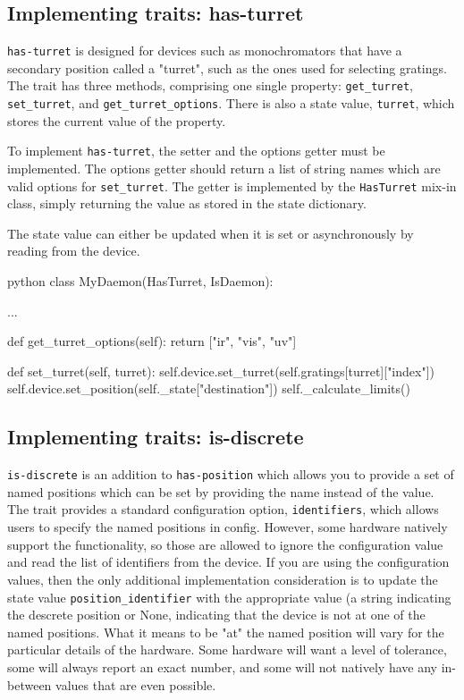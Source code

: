 \subsection{Implementing traits: has-turret}

\texttt{has-turret} is designed for devices such as monochromators that have a secondary position called a "turret", such as the ones used for selecting gratings.
The trait has three methods, comprising one single \yaq{} property: \texttt{get\_turret}, \texttt{set\_turret}, and \texttt{get\_turret\_options}.
There is also a state value, \texttt{turret}, which stores the current value of the property.

To implement \texttt{has-turret}, the setter and the options getter must be implemented.
The options getter should return a list of string names which are valid options for \texttt{set\_turret}.
The getter is implemented by the \texttt{HasTurret} mix-in class, simply returning the value as stored in the state dictionary.

The state value can either be updated when it is set or asynchronously by reading from the device.

\begin{codefragment}{python}
class MyDaemon(HasTurret, IsDaemon):

    ...

    def get_turret_options(self):
        return ["ir", "vis", "uv"]

    def set_turret(self, turret):
        self.device.set_turret(self.gratings[turret]["index"])
        self.device.set_position(self._state["destination"])
        self._calculate_limits()
\end{codefragment}

\subsection{Implementing traits: is-discrete}

\texttt{is-discrete} is an addition to \texttt{has-position} which allows you to provide a set of named positions which can be set by providing the name instead of the value.
The trait provides a standard configuration option, \texttt{identifiers}, which allows users to specify the named positions in config.
However, some hardware natively support the functionality, so those are allowed to ignore the configuration value and read the list of identifiers from the device.
If you are using the configuration values, then the only additional implementation consideration is to update the state value \texttt{position\_identifier} with the appropriate value (a string indicating the descrete position or None, indicating that the device is not at one of the named positions.
What it means to be "at" the named position will vary for the particular details of the hardware.
Some hardware will want a level of tolerance, some will always report an exact number, and some will not natively have any in-between values that are even possible.

